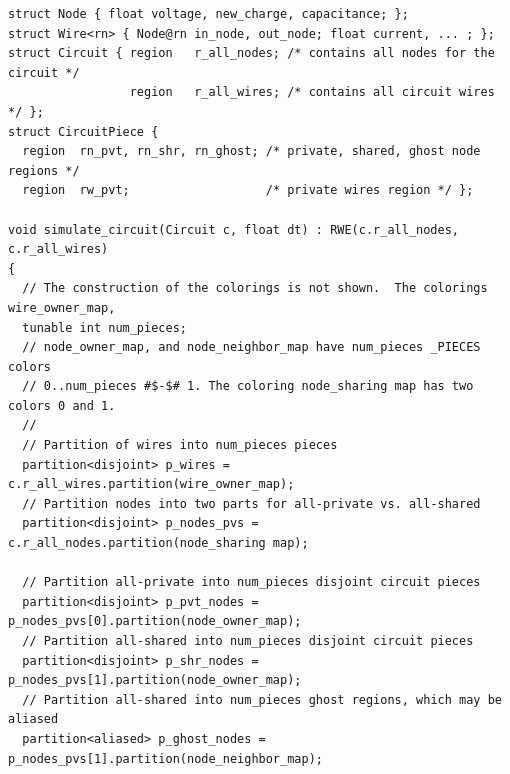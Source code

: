 \begin{lstlisting}[float,floatplacement=H,label={lst:code_ex},caption={Circuit simulation}]
struct Node { float voltage, new_charge, capacitance; };
struct Wire<rn> { Node@rn in_node, out_node; float current, ... ; };
struct Circuit { region   r_all_nodes; /* contains all nodes for the circuit */
                 region   r_all_wires; /* contains all circuit wires */ };
struct CircuitPiece {
  region  rn_pvt, rn_shr, rn_ghost; /* private, shared, ghost node regions */
  region  rw_pvt;                   /* private wires region */ };

void simulate_circuit(Circuit c, float dt) : RWE(c.r_all_nodes, c.r_all_wires)
{
  // The construction of the colorings is not shown.  The colorings wire_owner_map,
  tunable int num_pieces;
  // node_owner_map, and node_neighbor_map have num_pieces _PIECES colors 
  // 0..num_pieces #$-$# 1. The coloring node_sharing map has two colors 0 and 1.
  //
  // Partition of wires into num_pieces pieces
  partition<disjoint> p_wires = c.r_all_wires.partition(wire_owner_map); 
  // Partition nodes into two parts for all-private vs. all-shared
  partition<disjoint> p_nodes_pvs = c.r_all_nodes.partition(node_sharing map);

  // Partition all-private into num_pieces disjoint circuit pieces
  partition<disjoint> p_pvt_nodes = p_nodes_pvs[0].partition(node_owner_map);
  // Partition all-shared into num_pieces disjoint circuit pieces
  partition<disjoint> p_shr_nodes = p_nodes_pvs[1].partition(node_owner_map);
  // Partition all-shared into num_pieces ghost regions, which may be aliased
  partition<aliased> p_ghost_nodes = p_nodes_pvs[1].partition(node_neighbor_map);


\end{lstlisting}
